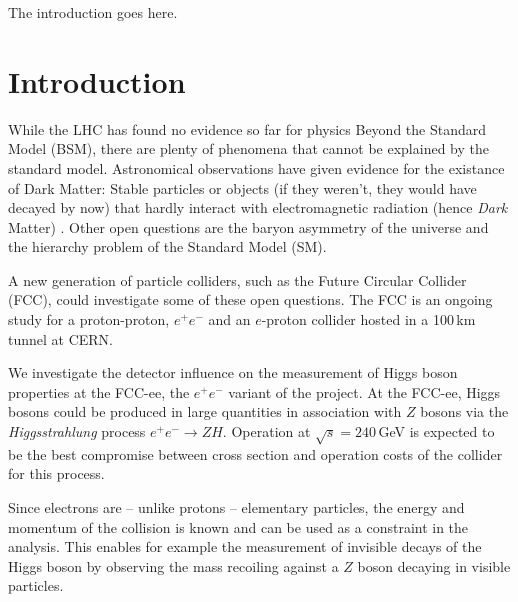 The introduction goes here.

\section{Introduction}
While the LHC has found no evidence so far for physics Beyond the Standard Model (BSM), there are plenty of phenomena that cannot be explained by the standard model. Astronomical observations have given evidence for the existance of Dark Matter: Stable particles or objects (if they weren't, they would have decayed by now) that hardly interact with electromagnetic radiation (hence \emph{Dark} Matter) \cite{pdg14}. 
Other open questions are the baryon asymmetry of the universe and the hierarchy problem of the Standard Model (SM).

A new generation of particle colliders, such as the Future Circular Collider (FCC), could investigate some of these open questions. The FCC is an ongoing study for a proton-proton, $e^+ e^-$ and an $e$-proton collider hosted in a 100\,km tunnel at CERN.

We investigate the detector influence on the measurement of Higgs boson properties at the FCC-ee, the $e^+ e^-$ variant of the project.
At the FCC-ee, Higgs bosons could be produced in large quantities in association with $Z$ bosons via the \emph{Higgsstrahlung} process $e^+ e^- \rightarrow ZH$. Operation at $\sqrt{s} = 240$\,GeV is expected to be the best compromise between cross section and operation costs of the collider for this process.

Since electrons are -- unlike protons -- elementary particles, the energy and momentum of the collision is known and can be used as a constraint in the analysis. This enables for example the measurement of invisible decays of the Higgs boson by observing the mass recoiling against a $Z$ boson decaying in visible particles.